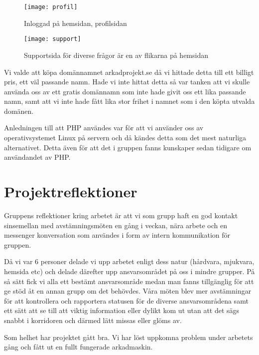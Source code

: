 \documentclass[12pt,fleqn,openany]{book} %
\begin{document}
\begin{figure}[h]
\centering\texttt{[image: profil]}
\caption{Inloggad på hemsidan, profilsidan}
\label{fig_profilsida}
\end{figure}

\begin{figure}[!h]
\centering\texttt{[image: support]}
\caption{Supportsida för diverse frågor är en av flikarna på hemsidan}
\label{fig_support}
\end{figure}

Vi valde att köpa domännamnet arkadprojekt.se då vi hittade detta till ett billigt pris, ett väl passande namn. Hade vi inte hittat
detta så var tanken att vi skulle använda oss av ett gratis domännamn som inte hade givit oss ett lika passande namn, samt att vi inte
hade fått lika stor frihet i namnet som i den köpta utvalda domänen.  

Anledningen till att PHP användes var för att vi använder oss av operativsystemet Linux på servern och då kändes detta som det mest 
naturliga alternativet. Detta även för att det i gruppen fanns kunskaper sedan tidigare om användandet av PHP.


\chapter{Projektreflektioner}

Gruppens reflektioner kring arbetet är att vi som grupp haft en god kontakt sinsemellan med avstämningsmöten en gång i veckan, nära 
arbete och en messenger konversation som användes i form av intern kommunikation för gruppen.

Då vi var 6 personer delade vi upp arbetet enligt dess natur (hårdvara, mjukvara, hemsida etc) och delade därefter upp ansvarsområdet 
på oss i mindre grupper. På så sätt fick vi alla ett bestämt ansvarsområde medan man fanns tillgänglig för att ge stöd åt en annan 
grupp om det behövdes. Våra möten blev mer avstämningar för att kontrollera och rapportera statusen för de diverse ansvarsområdena 
samt ett sätt att se till att viktig information eller dylikt kom ut utan att det sägs snabbt i korridoren och därmed lätt missas 
eller glöms av.

Som helhet har projektet gått bra. Vi har löst uppkomna problem under arbetets gång och fått ut en fullt fungerade arkadmaskin. 
\end{document}
